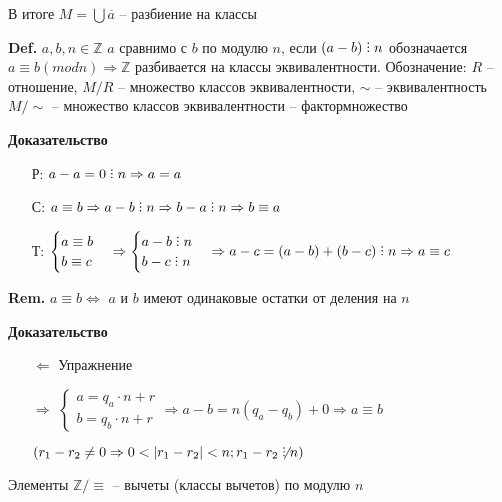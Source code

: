 \documentclass[14pt, letter paper]{article}
\def\divby{%
  \mathrel{\text{\vbox{\baselineskip.65ex\lineskiplimit0pt\hbox{.}\hbox{.}\hbox{.}}}}%
}
\begin{document}
В итоге $M = \bigcup \overline{a}$ -- разбиение на классы

\textbf{Def.} $a, b, n \in \mathds{Z}$ $a$ сравнимо с $b$ по модулю $n$, если $(a-b) \divby n$ обозначается $a \equiv b (mod n) \Rightarrow \mathds{Z}$ разбивается на классы эквивалентности. Обозначение: $R$ -- отношение, $M/R$ -- множество классов эквивалентности, $\sim$ -- эквивалентность $M/\sim$ -- множество классов эквивалентности -- фактормножество

\begin{center}
    \textbf{Доказательство}
\end{center}

\begin{itemize}
    \item[Р:] $a - a = 0 \divby n \Rightarrow a = a$
    \item[С:] $a \equiv b \Rightarrow a - b \divby n \Rightarrow b - a \divby n \Rightarrow b \equiv a$
    \item[Т:] $\begin{cases}
        a \equiv b \\
        b \equiv c
    \end{cases} \Rightarrow \begin{cases}
        a - b \divby n \\
        b - c \divby n
    \end{cases} \Rightarrow a - c = (a - b) + (b - c) \divby n \Rightarrow a \equiv c$
\end{itemize}

\textbf{Rem.} $a \equiv b \Leftrightarrow$ $a$ и $b$ имеют одинаковые остатки от деления на $n$

\begin{center}
    \textbf{Доказательство}
\end{center}

\begin{itemize}
    \item[$\Leftarrow$] Упражнение
    \item[$\Rightarrow$] $\begin{cases}
        a = q_a \cdot n + r \\
        b = q_b \cdot n + r 
    \end{cases} \Rightarrow a - b = n(q_a - q_b) + 0 \Rightarrow a \equiv b$

    $(r_1 - r_2 \neq 0 \Rightarrow 0 < |r_1 - r_2| < n; r_1 - r_2 \not\divby n)$
\end{itemize}

Элементы $\mathds{Z}/\equiv$ -- вычеты (классы вычетов) по модулю $n$
\end{document}
